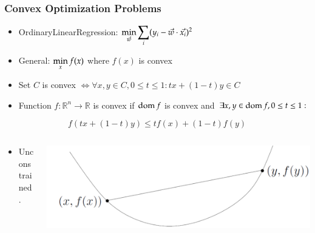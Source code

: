 \subsection{}
\begin{frame}
\frametitle{Convex Optimization Problems}


\begin{itemize}
\item OrdinaryLinearRegression: $\displaystyle \min_{\vec{w}}\sum_i(y_i -
  \vec{w} \cdot \vec{x_i})^2$
\item General: $\displaystyle \min_xf(x)$ where $f(x)$ is convex
\item Set $C$ is convex $\Longleftrightarrow \forall x, y\in C, 0\le t
  \le 1: tx +(1 - t)y \in C$
\item Function $f : \mathbb{R}^n \rightarrow \mathbb{R}$ is convex if
  $\operatorname{dom} f$ is convex and $\exists x, y \in \operatorname{dom} f, 0\le t \le 1:$

\end{itemize}

\vspace{-4mm}

{\small
$$f(tx + (1 - t)y) \le tf(x) + (1 - t)f(y)$$
}

\vspace{-4mm}

\begin{columns}
  \begin{column}{0.5\textwidth}

\begin{itemize}
\item Unconstrained.
\end{itemize}

  \end{column}

  \begin{column}{0.5\textwidth}
\includegraphics[scale=0.2]{pics/uncons.png}
  \end{column}
\end{columns}

\end{frame}

